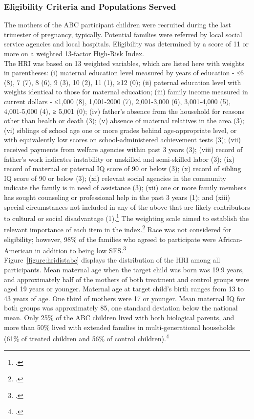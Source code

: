 \subsubsection{Eligibility Criteria and Populations Served}

\noindent The mothers of the ABC participant children were recruited during the last trimester  of pregnancy, typically. Potential families were referred by local social service agencies and local hospitals. Eligibility was determined by a score of 11 or more on a weighted 13-factor High-Risk Index.\\ 

\noindent The HRI was based on 13 weighted variables, which are listed here with weights in parentheses: (i) maternal education level measured by years of education - ≤6 (8), 7 (7), 8 (6), 9 (3), 10 (2), 11 (1), ≥12 (0); (ii) paternal education level with weights identical to those for maternal education; (iii) family income measured in current dollars - ≤1,000 (8), 1,001-2000 (7), 2,001-3,000 (6), 3,001-4,000 (5), 4,001-5,000 (4), ≥ 5,001 (0); (iv) father’s absence from the household for reasons other than health or death (3); (v) absence of maternal relatives in the area (3); (vi) siblings of school age one or more grades behind age-appropriate level, or with equivalently low scores on school-administered achievement tests (3); (vii) received payments from welfare agencies within past 3 years (3); (viii) record of father's work indicates instability or unskilled and semi-skilled labor (3); (ix) record of maternal or paternal IQ score of 90 or below (3); (x) record of sibling IQ score of 90 or below (3); (xi) relevant social agencies in the community indicate the family is in need of assistance (3); (xii) one or more family members has sought counseling or professional help in the past 3 years (1); and (xiii) special circumstances not included in any of the above that are likely contributors to cultural or social disadvantage (1).\footnote{\citet{Ramey_Smith_1977_AJMD, Ramey_Campbell_1984_AJMD,Ramey_Campbell_1991_childreninpoverty,Ramey_Campbell_etal_2000_ADS}.} The weighting scale aimed to establish the relevant importance of each item in the index.\footnote{\citet{Ramey_Smith_1977_AJMD}.} Race was not  considered for eligibility; however, 98\% of the families who agreed to participate were African-American in addition to being low SES.\footnote{\citet{Ramey_Smith_1977_AJMD,Ramey_Campbell_1979_SR}.} \\

\noindent Figure~\ref{figure:hridistabc} displays the distribution of the HRI among all participants.  Mean maternal age when the target child was born was 19.9 years, and approximately half of the mothers of both treatment and control groups were aged 19 years or younger. Maternal age at target child's birth ranges from 13 to 43 years of age. One third of mothers were 17 or younger. Mean maternal IQ for both groups was approximately 85, one standard deviation below the national mean. Only 25\% of the ABC children lived with both biological parents, and more than 50\% lived with extended families in multi-generational households (61\% of treated children and 56\% of control children).\footnote{\citet{Ramey_Campbell_1991_childreninpoverty,Campbell_Ramey_1994_CD}.}

